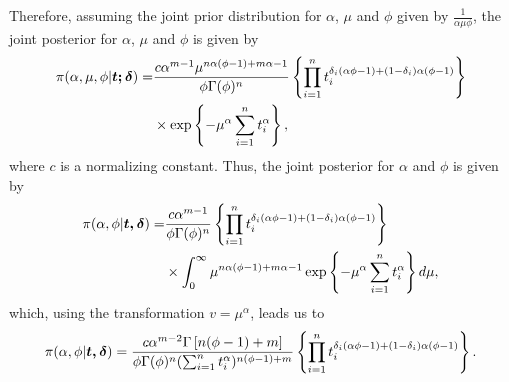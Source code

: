 Therefore, assuming the joint prior distribution for $\alpha$, $\mu$ and $\phi$ given by $\frac{1}{\alpha\mu\phi}$, the joint posterior for $\alpha$, $\mu$ and $\phi$ is given by
\begin{align*}%
\pi(\alpha,\mu,\phi|\bs{t;\delta})
=&\frac{c\alpha^{m-1}\mu^{n\alpha(\phi-1)+m\alpha-1}}{\phi\Gamma(\phi)^n}\left\{\prod_{i=1}^n{t_i^{\delta_i(\alpha\phi-1)+(1-\delta_i)\alpha(\phi-1)}}\right\}\nonumber \\
&\times \exp\left\{-\mu^{\alpha}\sum_{i=1}^n t_i^{\alpha}\right\},
\end{align*} %
where $c$ is a normalizing constant. Thus, the joint posterior for $\alpha$ and $\phi$ is given by
\begin{align*}\pi(\alpha,\phi|\boldsymbol{t,\delta})
=&\frac{c\alpha^{m-1}}{\phi\Gamma(\phi)^n}\left\{\prod_{i=1}^n{t_i^{\delta_i(\alpha\phi-1)+(1-\delta_i)\alpha(\phi-1)}}\right\}\nonumber\\
&\times \int_{0}^\infty \mu^{n\alpha(\phi-1)+m\alpha-1} \exp\left\{-\mu^{\alpha}\sum_{i=1}^n t_i^{\alpha}\right\}d\mu,
\end{align*}
which, using the transformation $v=\mu^{\alpha}$, leads us to
\begin{equation*}%
\pi(\alpha,\phi|\bs{t,\delta})
=\frac{c\alpha^{m-2}\Gamma\left[n(\phi-1)+m\right]}{\phi\Gamma(\phi)^n(\sum_{i=1}^n t_i^\alpha)^{n(\phi-1)+m}} \left\{\prod_{i=1}^n{t_i^{\delta_i(\alpha\phi-1)+(1-\delta_i)\alpha(\phi-1)}}\right\}.
\end{equation*}

